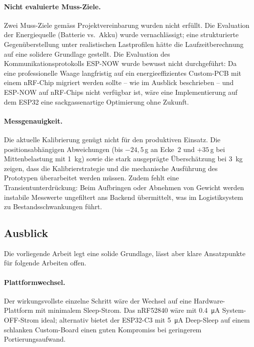 \documentclass[12pt,a4paper]{article}
\begin{document}
	\paragraph{Nicht evaluierte Muss-Ziele.}
	Zwei Muss-Ziele gemäss Projektvereinbarung wurden nicht erfüllt.
	Die Evaluation der Energiequelle (Batterie vs.\ Akku) wurde vernachlässigt; eine strukturierte Gegenüberstellung unter realistischen Lastprofilen hätte die Laufzeitberechnung auf eine solidere Grundlage gestellt.
	Die Evaluation des Kommunikationsprotokolls ESP-NOW wurde bewusst nicht durchgeführt: Da eine professionelle Waage langfristig auf ein energieeffizientes Custom-PCB mit einem nRF-Chip migriert werden sollte -- wie im Ausblick beschrieben -- und ESP-NOW auf nRF-Chips nicht verfügbar ist, wäre eine Implementierung auf dem ESP32 eine sackgassenartige Optimierung ohne Zukunft.

	\paragraph{Messgenauigkeit.}
	Die aktuelle Kalibrierung genügt nicht für den produktiven Einsatz.
	Die positionsabhängigen Abweichungen (bis $-24{,}5$\,g an Ecke~2 und $+35$\,g bei Mittenbelastung mit \SI{1}{\kilogram}) sowie die stark ausgeprägte Überschätzung bei \SI{3}{\kilogram} zeigen, dass die Kalibrierstrategie und die mechanische Ausführung des Prototypen überarbeitet werden müssen.
	Zudem fehlt eine Transientunterdrückung: Beim Aufbringen oder Abnehmen von Gewicht werden instabile Messwerte ungefiltert ans Backend übermittelt, was im Logistiksystem zu Bestandsschwankungen führt.

	\subsection{Ausblick}

	Die vorliegende Arbeit legt eine solide Grundlage, lässt aber klare Ansatzpunkte für folgende Arbeiten offen.

	\paragraph{Plattformwechsel.}
	Der wirkungsvollste einzelne Schritt wäre der Wechsel auf eine Hardware-Plattform mit minimalem Sleep-Strom.
	Das nRF52840 wäre mit \SI{0.4}{\micro\ampere} System-OFF-Strom ideal; alternativ bietet der ESP32-C3 mit \SI{5}{\micro\ampere} Deep-Sleep auf einem schlanken Custom-Board einen guten Kompromiss bei geringerem Portierungsaufwand.
\end{document}
